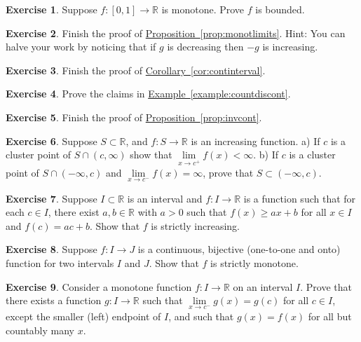 \documentclass[12pt]{book}
\newcommand{\R}{{\mathbb{R}}}
\theoremstyle{plain}
\theoremstyle{remark}
\theoremstyle{definition}
\theoremstyle{exercise}
\newtheorem{exercise}{Exercise}[section]
\theoremstyle{example}
\newcommand{\exampleref}[1]{\hyperref[#1]{Example~\ref*{#1}}}
\newcommand{\propref}[1]{\hyperref[#1]{Proposition~\ref*{#1}}}
\newcommand{\corref}[1]{\hyperref[#1]{Corollary~\ref*{#1}}}
\begin{document}
\begin{exercise}
Suppose $f \colon [0,1] \to \R$ is monotone.  Prove $f$ is bounded.
\end{exercise}

\begin{exercise}
Finish the proof of \propref{prop:monotlimits}.
Hint: You can halve your work by noticing that if $g$ is decreasing
then $-g$ is increasing.
\end{exercise}

\begin{exercise}
Finish the proof of \corref{cor:continterval}.
\end{exercise}

\begin{exercise}
Prove the claims in \exampleref{example:countdiscont}.
\end{exercise}

\begin{exercise}
Finish the proof of \propref{prop:invcont}.
\end{exercise}

\begin{exercise}
Suppose $S \subset \R$, and $f \colon S \to \R$ is an increasing
function.
a) If $c$ is a cluster point
of $S \cap (c,\infty)$ show that 
$\lim\limits_{x\to c^+} f(x) < \infty$.
b) If $c$ is a cluster point of $S \cap (-\infty,c)$
and $\lim\limits_{x\to c^-} f(x) = \infty$, prove that 
$S \subset (-\infty,c)$.
\end{exercise}

\begin{exercise}
Suppose $I \subset \R$ is an interval and $f \colon I \to \R$ is a function
such that for each $c \in I$, there exist $a, b \in \R$ with
$a > 0$ such that $f(x) \geq a x + b$ for all $x \in I$
and $f(c) = a c + b$.  Show that $f$ is strictly increasing.
\end{exercise}

\begin{exercise}
Suppose $f \colon I \to J$ is a continuous, bijective (one-to-one and onto)
function for two intervals $I$ and $J$.  Show that $f$ is strictly monotone.
\end{exercise}

\begin{exercise}
Consider a monotone function $f \colon I \to \R$ on an interval $I$.  Prove that there exists
a function $g \colon I \to \R$ such that
$\lim\limits_{x \to c^-} g(x) = g(c)$ for all $c \in I$, except the
smaller (left) endpoint of $I$, and such that
$g(x) = f(x)$ for all but countably many $x$.
\end{exercise}
\end{document}

